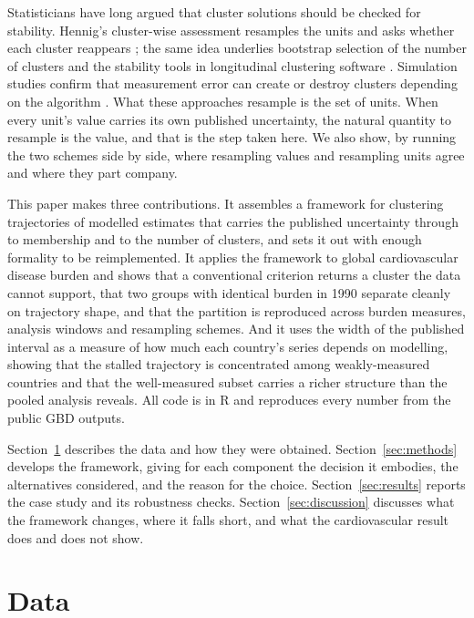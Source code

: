 \documentclass[11pt,a4paper]{article}
\begin{document}
Statisticians have long argued that cluster solutions should be checked for stability. Hennig's cluster-wise assessment resamples the units and asks whether each cluster reappears \citep{hennig2007}; the same idea underlies bootstrap selection of the number of clusters \citep{fang2012} and the stability tools in longitudinal clustering software \citep{denteuling2024}. Simulation studies confirm that measurement error can create or destroy clusters depending on the algorithm \citep{measerr2020}. What these approaches resample is the set of units. When every unit's value carries its own published uncertainty, the natural quantity to resample is the value, and that is the step taken here. We also show, by running the two schemes side by side, where resampling values and resampling units agree and where they part company.

This paper makes three contributions. It assembles a framework for clustering trajectories of modelled estimates that carries the published uncertainty through to membership and to the number of clusters, and sets it out with enough formality to be reimplemented. It applies the framework to global cardiovascular disease burden and shows that a conventional criterion returns a cluster the data cannot support, that two groups with identical burden in 1990 separate cleanly on trajectory shape, and that the partition is reproduced across burden measures, analysis windows and resampling schemes. And it uses the width of the published interval as a measure of how much each country's series depends on modelling, showing that the stalled trajectory is concentrated among weakly-measured countries and that the well-measured subset carries a richer structure than the pooled analysis reveals. All code is in R and reproduces every number from the public GBD outputs.

Section~\ref{sec:data} describes the data and how they were obtained. Section~\ref{sec:methods} develops the framework, giving for each component the decision it embodies, the alternatives considered, and the reason for the choice. Section~\ref{sec:results} reports the case study and its robustness checks. Section~\ref{sec:discussion} discusses what the framework changes, where it falls short, and what the cardiovascular result does and does not show.

\section{Data}\label{sec:data}
\end{document}
